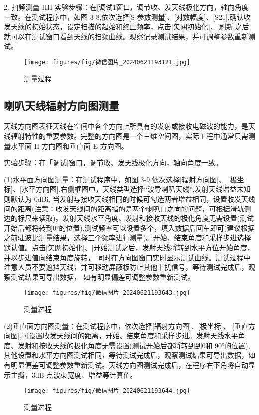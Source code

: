 \documentclass[12pt,hyperref,a4paper,UTF8]{ctexart}
\begin{document}
2. 扫频测量
HH
实验步骤：在[调试1窗口，调节收、发天线极化方向，轴向角度一致。在测试程序中，如图 3-8,依次选择[S 参数测量]、[对数幅度]、[S21],确认收发天线的初始状态，设定扫描的起始和终止频率，点击[矢网初始化]、[刷新]之后就可以在测试窗口看到天线的扫频曲线。观察记录测试结果，并可调整参数重新测试。

\begin{figure}[H]
    \centering
    \texttt{[image: figures/fig/微信图片\_20240621193121.jpg]}
    \caption{测量过程}
\end{figure}











\subsection{喇叭天线辐射方向图测量}
天线方向图表征天线在空间中各个方向上所具有的发射或接收电磁波的能力，是天线辐射特性的重要参数。完整的方向图是一个三维空间图，实际工程中通常只需测量水平面 H 方向图和垂直面 E 方向图。

实验步骤：在「调试[窗口，调节收、发天线极化方向，轴向角度一致。

(1)水平面方向图测量：在测试程序中，如图 3-9,依次选择[辐射方向图]、 [极坐标]、[水平方向图],右侧框图中，天线类型选择“波导喇叭天线”,发射天线增益未知则默认为 0dBi, 当发射与接收天线相同的时候可勾选两者增益相同，设置收发天线间的距离(注意：收发天线间的距离指的是两个喇叭口之向的问题，可根据滑轨侧边的标尺来读取)。发射天线水平角度、发射和接收天线的极化角度无需设置(测试开始后都将转到0°的位置),测试频率可以设置多个，填入数据后回车即可(建议根据之前驻波比测量结果，选择三个频率进行测量)。开始、结束角度和采样步进选择默认值。点击[矢网初始化]、[开始测试之后，发射天线将转到水平方位开始角度，并以步进值向结束角度旋转， 同时在方向图窗口实时显示测试曲线。测试过程中注意人员不要遮挡天线，并可移动屏蔽板防止其他十扰信号，等待测试完成后，观察测试结果可导出数据， 如有明显偏差可调整参数重新测试。
\begin{figure}[H]
    \centering
    \texttt{[image: figures/fig/微信图片\_20240621193643.jpg]}
    \caption{测量过程}
\end{figure}



(2)垂直面方向图测量：在测试程序中，依次选择[辐射方向图]、[极坐标]、 [垂直方向图],可设置收发天线间的距离，开始、结束角度和采样步进。发射天线水平角度、发射和按收天线的极化角度无需设置(测试开始后都将转到到0和 90°的位置),其他设置和水平方向图测试相同，等待测试完成后，观察测试结果可导出数据，如有明显偏差可调整参数重新测试。天线方向图测试完成后，在程序右下角将自动显示主瓣，3dB 点波束宽度、增益等计算值。
\begin{figure}[H]
    \centering
    \texttt{[image: figures/fig/微信图片\_20240621193644.jpg]}
    \caption{测量过程}
\end{figure}
\end{document}

